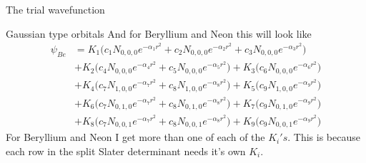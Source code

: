 \documentclass[a4paper, 12pt, titlepage]{article}
\begin{document}
\begin{section}{The trial wavefunction}
\begin{subsection}{Gaussian type orbitals}
  And for Beryllium and Neon this will look like
	\begin{align}
	\psi_{Be}&=
	K_{1}\biggl(c_{1}N_{0,0,0}e^{-\alpha_{1}r^{2}}+c_{2}N_{0,0,0}e^{-\alpha_{2}r^{2}}+c_{3}N_{0,0,0}e^{-\alpha_{3}r^{2}}\biggl)\\
	&+K_{2}\biggl(c_{4}N_{0,0,0}e^{-\alpha_{4}r^{2}}+c_{5}N_{0,0,0}e^{-\alpha_{5}r^{2}}\biggl)
	+K_{3}\biggl(c_{6}N_{0,0,0}e^{-\alpha_{6}r^{2}}\biggl)\\
	&+K_{4}\biggl(c_{7}N_{1,0,0}e^{-\alpha_{7}r^{2}}+c_{8}N_{1,0,0}e^{-\alpha_{8}r^{2}}\biggl)
	+K_{5}\biggl(c_{9}N_{1,0,0}e^{-\alpha_{9}r^{2}}\biggl)\\
	&+K_{6}\biggl(c_{7}N_{0,1,0}e^{-\alpha_{7}r^{2}}+c_{8}N_{0,1,0}e^{-\alpha_{8}r^{2}}\biggl)
	+K_{7}\biggl(c_{9}N_{0,1,0}e^{-\alpha_{9}r^{2}}\biggl)\\
	&+K_{8}\biggl(c_{7}N_{0,0,1}e^{-\alpha_{7}r^{2}}+c_{8}N_{0,0,1}e^{-\alpha_{8}r^{2}}\biggl)
	+K_{9}\biggl(c_{9}N_{0,0,1}e^{-\alpha_{9}r^{2}}\biggl)
	\end{align}
  For Beryllium and Neon I get more than one of each of the $K_i's$. This is because each row in the split Slater determinant needs it's own $K_i$. 
 \end{subsection}
\end{section}
\newpage
\end{document}
